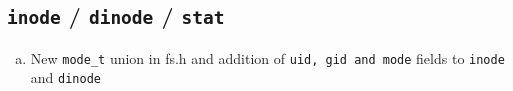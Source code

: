 \documentclass[11pt,letterpaper]{report}
\begin{document}
                                                                                                                                                                                                                                                                                                                                                                              \subsection*{{\tt inode} / {\tt dinode} / {\tt stat}}
                                                                                                                                                                                                                                                                                                                                                                                \begin{enumerate}[(a)]
                                                                                                                                                                                                                                                                                                                                                                                      \item New {\tt mode\_t} union in fs.h and addition of {\tt uid, gid and mode} fields to {\tt inode} and {\tt dinode}
                                                                                                                                                                                                                                                                                                                                                                                            

\end{enumerate}
\end{document}
